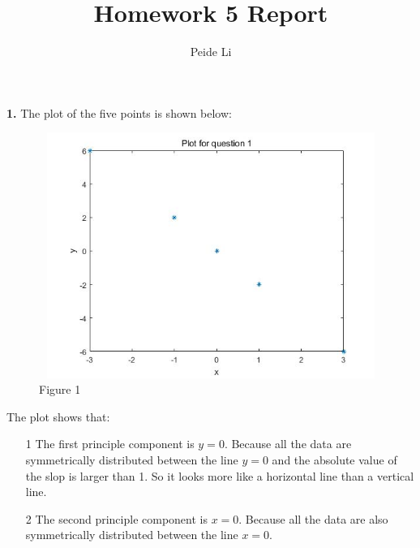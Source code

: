 \documentclass[letterpaper,12pt]{article}
\title{Homework 5 Report}
\author{Peide Li}
\begin{document}
\maketitle

\textbf{1.} The plot of the five points is shown below:
\begin{center}
\begin{figure}[h]
\includegraphics[width = 14cm, height = 8cm]{plot1.jpg}
\caption{Figure 1}
\end{figure}
\end{center}

The plot shows that:
\begin{itemize}
\item[1] The first principle component is $y = 0$. Because all the data are symmetrically distributed between the line $y = 0$ and the absolute value of the slop is larger than 1. So it looks more like a horizontal line than a vertical line.
\item[2] The second principle component is $x= 0$. Because all the data are also symmetrically distributed between the line $x = 0$.
\end{itemize}
\end{document}
